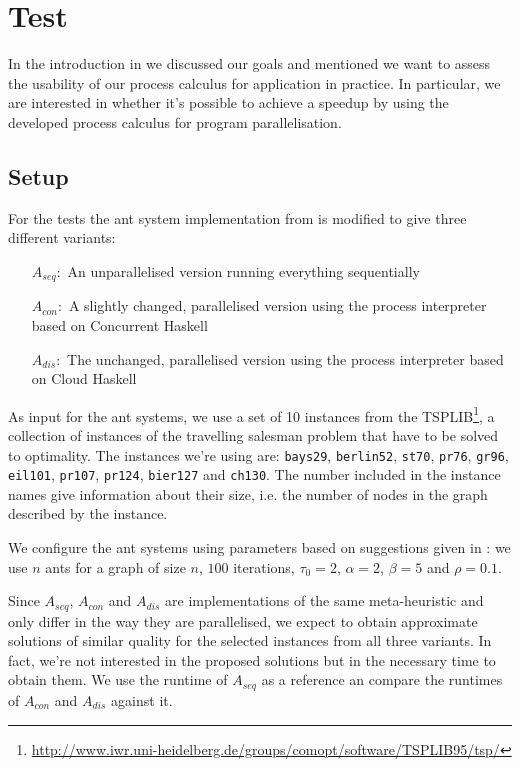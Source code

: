 \chapter{Test}
\label{chp:test}
In the introduction in  we discussed our goals and mentioned we want to assess the usability of our process calculus for application in practice. In particular, we are interested in whether it's possible to achieve a speedup by using the developed process calculus for program parallelisation.

\section{Setup}
For the tests the ant system implementation from  is modified to give three different variants:
\begin{itemize}
  \item[$A_{seq}\colon$] An unparallelised version running everything sequentially
  \item[$A_{con}\colon$] A slightly changed, parallelised version using the process interpreter based on \textsf{Concurrent Haskell}
  \item[$A_{dis}\colon$] The unchanged, parallelised version using the process interpreter based on {Cloud Haskell}
\end{itemize}

As input for the ant systems, we use a set of 10 instances from the TSPLIB\footnote{\url{http://www.iwr.uni-heidelberg.de/groups/comopt/software/TSPLIB95/tsp/}}, a collection of instances of the travelling salesman problem that have to be solved to optimality. The instances we're using are: \texttt{bays29}, \texttt{berlin52}, \texttt{st70}, \texttt{pr76}, \texttt{gr96}, \texttt{eil101}, \texttt{pr107}, \texttt{pr124}, \texttt{bier127} and \texttt{ch130}. The number included in the instance names give information about their size, i.e. the number of nodes in the graph described by the instance.

We configure the ant systems using parameters based on suggestions given in \cite{Dorigo:2004:ACO:975277}: we use $n$ ants for a graph of size $n$, $100$ iterations, $\tau_0 = 2$, $\alpha = 2$, $\beta = 5$ and $\rho = 0.1$.

Since $A_{seq}$, $A_{con}$ and $A_{dis}$ are implementations of the same meta-heuristic and only differ in the way they are parallelised, we expect to obtain approximate solutions of similar quality for the selected instances from all three variants. In fact, we're not interested in the proposed solutions but in the necessary time to obtain them. We use the runtime of $A_{seq}$ as a reference an compare the runtimes of $A_{con}$ and $A_{dis}$ against it.


